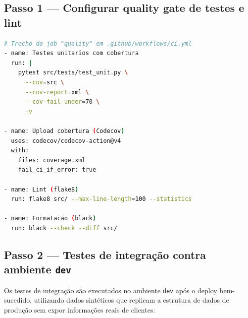 \subsection{Passo 1 --- Configurar quality gate de testes e lint}

\begin{lstlisting}[language=bash,
  caption={Job de quality gate no GitHub Actions com cobertura e lint.},
  label={lst:quality_gate}]
# Trecho do job "quality" em .github/workflows/ci.yml
- name: Testes unitarios com cobertura
  run: |
    pytest src/tests/test_unit.py \
      --cov=src \
      --cov-report=xml \
      --cov-fail-under=70 \
      -v

- name: Upload cobertura (Codecov)
  uses: codecov/codecov-action@v4
  with:
    files: coverage.xml
    fail_ci_if_error: true

- name: Lint (flake8)
  run: flake8 src/ --max-line-length=100 --statistics

- name: Formatacao (black)
  run: black --check --diff src/
\end{lstlisting}

\subsection{Passo 2 --- Testes de integra\c{c}\~ao contra ambiente \texttt{dev}}

Os testes de integra\c{c}\~ao s\~ao executados
no ambiente \texttt{dev} ap\'os o deploy bem-sucedido, utilizando
dados sint\'eticos que replicam a estrutura de dados de produ\c{c}\~ao
sem expor informa\c{c}\~oes reais de clientes:

